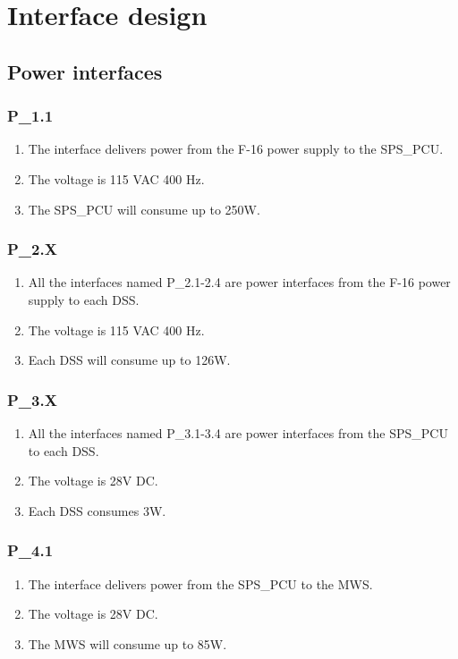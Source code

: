 \documentclass[Main]{subfiles}
\begin{document}
\section{Interface design}

\subsection{Power interfaces}

\subsubsection{P\_1.1}
\begin{enumerate}[label = \bfseries ID-1.\arabic*]
\item The interface delivers power from the F-16 power supply to the SPS\_PCU. 
\item The voltage is 115 VAC 400 Hz. 
\item The SPS\_PCU will consume up to 250W.
\end{enumerate}

\subsubsection{P\_2.X}
\begin{enumerate}[label = \bfseries ID-2.\arabic*]
\item All the interfaces named P\_2.1-2.4 are power interfaces from the F-16 power supply to each DSS. 
\item The voltage is 115 VAC 400 Hz. 
\item Each DSS will consume up to 126W.
\end{enumerate}

\subsubsection{P\_3.X}
\begin{enumerate}[label = \bfseries ID-3.\arabic*]
\item All the interfaces named P\_3.1-3.4 are power interfaces from the SPS\_PCU to each DSS. 
\item The voltage is 28V DC. 
\item Each DSS consumes 3W.
\end{enumerate}

\subsubsection{P\_4.1}
\begin{enumerate}[label = \bfseries ID-4.\arabic*]
\item The interface delivers power from the SPS\_PCU to the MWS. 
\item The voltage is 28V DC. 
\item The MWS will consume up to 85W.
\end{enumerate}
\end{document}
